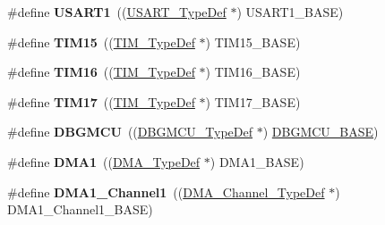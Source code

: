 \begin{DoxyCompactItemize}
\item 
\mbox{\label{group___peripheral__declaration_ga92871691058ff7ccffd7635930cb08da}} 
\#define {\bfseries U\+S\+A\+R\+T1}~((\hyperlink{struct_u_s_a_r_t___type_def}{U\+S\+A\+R\+T\+\_\+\+Type\+Def} $\ast$) U\+S\+A\+R\+T1\+\_\+\+B\+A\+SE)
\item 
\mbox{\label{group___peripheral__declaration_ga87e4b442041d1c03a6af113fbe04a182}} 
\#define {\bfseries T\+I\+M15}~((\hyperlink{struct_t_i_m___type_def}{T\+I\+M\+\_\+\+Type\+Def} $\ast$) T\+I\+M15\+\_\+\+B\+A\+SE)
\item 
\mbox{\label{group___peripheral__declaration_ga73ec606e7dacf17e18c661e8ff8c7c8d}} 
\#define {\bfseries T\+I\+M16}~((\hyperlink{struct_t_i_m___type_def}{T\+I\+M\+\_\+\+Type\+Def} $\ast$) T\+I\+M16\+\_\+\+B\+A\+SE)
\item 
\mbox{\label{group___peripheral__declaration_ga65aea6c8b36439e44ad6cde0e6891aab}} 
\#define {\bfseries T\+I\+M17}~((\hyperlink{struct_t_i_m___type_def}{T\+I\+M\+\_\+\+Type\+Def} $\ast$) T\+I\+M17\+\_\+\+B\+A\+SE)
\item 
\mbox{\label{group___peripheral__declaration_ga92ec6d9ec2251fda7d4ce09748cd74b4}} 
\#define {\bfseries D\+B\+G\+M\+CU}~((\hyperlink{struct_d_b_g_m_c_u___type_def}{D\+B\+G\+M\+C\+U\+\_\+\+Type\+Def} $\ast$) \hyperlink{group___peripheral__memory__map_ga4adaf4fd82ccc3a538f1f27a70cdbbef}{D\+B\+G\+M\+C\+U\+\_\+\+B\+A\+SE})
\item 
\mbox{\label{group___peripheral__declaration_gacc16d2a5937f7585320a98f7f6b578f9}} 
\#define {\bfseries D\+M\+A1}~((\hyperlink{struct_d_m_a___type_def}{D\+M\+A\+\_\+\+Type\+Def} $\ast$) D\+M\+A1\+\_\+\+B\+A\+SE)
\item 
\mbox{\label{group___peripheral__declaration_gac83c5be824be1c02716e2522e80ddf7a}} 
\#define {\bfseries D\+M\+A1\+\_\+\+Channel1}~((\hyperlink{struct_d_m_a___channel___type_def}{D\+M\+A\+\_\+\+Channel\+\_\+\+Type\+Def} $\ast$) D\+M\+A1\+\_\+\+Channel1\+\_\+\+B\+A\+SE)
\item 

\end{DoxyCompactItemize}
